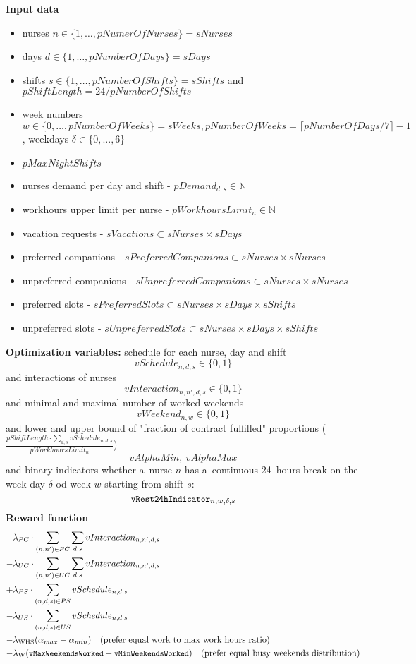 \documentclass{article}
\newcommand{\N}{\mathbb{N}}
\newcommand{\varMinWeekendsWorked}{\texttt{\small vMinWeekendsWorked}}
\newcommand{\varMaxWeekendsWorked}{\texttt{\small vMaxWeekendsWorked}}
\newcommand{\varDayLengthBreakIndicator}[4]{\texttt{\small vRest24hIndicator}_{#1, #2, #3, #4}}
\begin{document}
\noindent \textbf{Input data}
\begin{itemize}
    \item nurses $n\in \{1, \dots, pNumerOfNurses\} = sNurses$
    \item days $d\in \{1, \dots, pNumberOfDays\} = sDays$
    \item shifts $s\in \{1, \dots, pNumberOfShifts\} = sShifts$ and $pShiftLength = 24/pNumberOfShifts$
    \item week numbers $w\in\{0, \dots, pNumberOfWeeks\} = sWeeks, pNumberOfWeeks=\lceil pNumberOfDays/7 \rceil - 1$, weekdays $\delta \in \{0, ..., 6\}$
    \item $pMaxNightShifts$
    \item nurses demand per day and shift - $pDemand_{d,s} \in \N$
    \item workhours upper limit per nurse - $pWorkhoursLimit_n \in \N$
    \item vacation requests - $sVacations \subset sNurses \times sDays$
    \item preferred companions - $sPreferredCompanions \subset sNurses \times sNurses$
    \item unpreferred companions - $sUnpreferredCompanions \subset sNurses \times sNurses$
    \item preferred slots - $sPreferredSlots \subset sNurses \times sDays \times sShifts$
    \item unpreferred slots - $sUnpreferredSlots \subset sNurses \times sDays \times sShifts$
\end{itemize}
\textbf{Optimization variables:} schedule for each nurse, day and shift 
$$vSchedule_{n,d,s} \in \{0,1\}$$
and interactions of nurses
$$vInteraction_{n,n',d,s} \in \{0,1\}$$
and minimal and maximal number of worked weekends
$$vWeekend_{n, w} \in \{0, 1\}$$
and lower and upper bound of "fraction of contract fulfilled" proportions ($\frac{pShiftLength\cdot\sum_{d,s}vSchedule_{n,d,s}}{pWorkhoursLimit_n}$)
$$vAlphaMin,\ vAlphaMax$$
and binary indicators whether a~nurse $n$ has a~continuous 24--hours break on the week day $\delta$ od week $w$ starting from shift $s$:
$$\varDayLengthBreakIndicator{n}{w}{\delta}{s}$$
\textbf{Reward function}
\begin{align*}
     &\lambda_{PC}\cdot\sum_{(n, n')\in PC}\sum_{d,s} vInteraction_{n,n',d,s} \\
    -&\lambda_{UC}\cdot\sum_{(n, n')\in UC}\sum_{d,s} vInteraction_{n,n',d,s} \\ 
    +&\lambda_{PS}\cdot\sum_{(n, d, s)\in PS} vSchedule_{n,d,s} \\ 
    -&\lambda_{US}\cdot\sum_{(n, d, s)\in US} vSchedule_{n,d,s} \\
    - &\lambda_\text{WHS} (\alpha_{max} - \alpha_{min})\quad \text{(prefer equal work to max work hours ratio)} \\
    - &\lambda_\text{W} (\varMaxWeekendsWorked - \varMinWeekendsWorked)\quad \text{(prefer equal busy weekends distribution)}
\end{align*}
\end{document}

